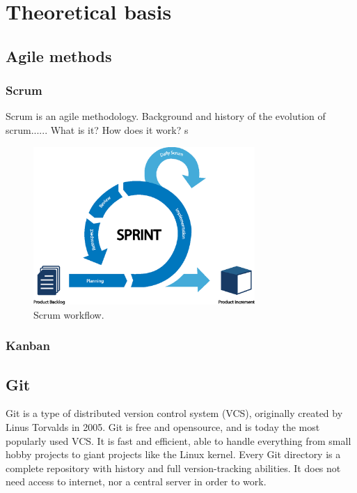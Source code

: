 \chapter{Theoretical basis}

\section{Agile methods}
\subsection{Scrum}
Scrum is an agile methodology. 
Background and history of the evolution of scrum......
What is it? How does it work?
s
\begin{figure}[h]
    \centering
    \includegraphics[page=1,width=0.75\textwidth]{sections/theory/figures/scrum.eps}
    \caption{Scrum workflow.}
    \label{fig:scrum}
\end{figure}

\subsection{Kanban}

\section{Git}
Git is a type of distributed version control system (VCS), originally created by Linus Torvalds in 2005. Git is free and opensource, and is today the most popularly used VCS. It is fast and efficient, able to handle everything from small hobby projects to giant projects like the Linux kernel. Every Git directory is a complete repository with history and full version-tracking abilities. It does not need access to internet, nor a central server in order to work.

